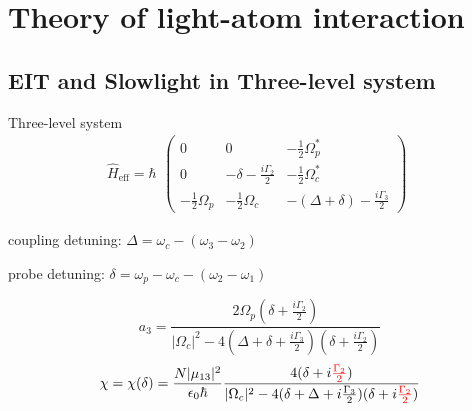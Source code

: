 \section{Theory of light-atom interaction}

\subsection{EIT and Slowlight in Three-level system}

\begin{frame}{Three-level system}
  \begin{equation*}
    \hat{H}_{\text{eff}} = \hbar 
    \begin{matrix}
      \begin{pmatrix}
        0 & 0 & -\frac{1}{2}\Omega_p^{*} \\
        0 & -\delta - \frac{i\Gamma_2}{2} & -\frac{1}{2}\Omega_c^{*} \\
        -\frac{1}{2}\Omega_p & -\frac{1}{2}\Omega_c & -(\Delta+\delta) - \frac{i\Gamma_3}{2}
      \end{pmatrix}
    \end{matrix}
  \end{equation*}
  
  coupling detuning: $\Delta = \omega_c - (\omega_3 - \omega_2)$
  
  probe detuning: $\delta = \omega_p - \omega_c - (\omega_2 - \omega_1)$
  
  \begin{equation*}
    a_3 = \frac{2\Omega_p (\delta+\frac{i\Gamma_2}{2})}{|\Omega_c|^2 - 4(\Delta+\delta+\frac{i\Gamma_3}{2})(\delta+\frac{i\Gamma_2}{2})}
  \end{equation*}
  \begin{equation*}
    \chi = \chi(\delta) = \frac{N|\mu_{13}|^2}{\epsilon_0 \hbar} \frac{4(\delta+i\textcolor{red}{\frac{\Gamma_2}{2}})}{|\Omega_c|^2 - 4(\delta+\Delta+i\frac{\Gamma_3}{2}) (\delta + i\textcolor{red}{\frac{\Gamma_2}{2}})}
  \end{equation*}
\end{frame}

